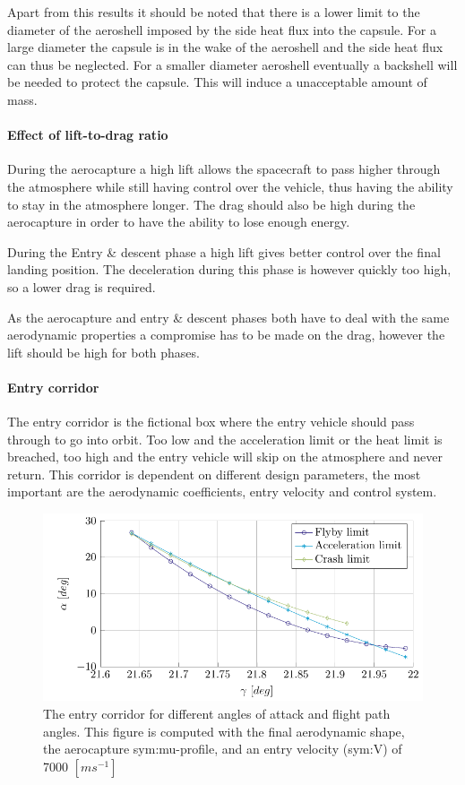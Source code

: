 Apart from this results it should be noted that there is a lower limit to the diameter of the aeroshell imposed by the side heat flux into the capsule. For a large diameter the capsule is in the wake of the aeroshell and the side heat flux can thus be neglected. For a smaller diameter aeroshell eventually a backshell will be needed to protect the capsule. This will induce a unacceptable amount of mass.

\paragraph{Effect of lift-to-drag ratio}
During the aerocapture a high lift allows the spacecraft to pass higher through the atmosphere while still having control over the vehicle, thus having the ability to stay in the atmosphere longer. The drag should also be high during the aerocapture in order to have the ability to lose enough energy.

During the Entry \& descent phase a high lift gives better control over the final landing position. The deceleration during this phase is however quickly too high, so a lower drag is required.

As the aerocapture and entry \& descent phases both have to deal with the same aerodynamic properties a compromise has to be made on the drag, however the lift should be high for both phases.

\paragraph{Entry corridor}
The entry corridor is the fictional box where the entry vehicle should pass through to go into orbit. Too low and the acceleration limit or the heat limit is breached, too high and the entry vehicle will skip on the atmosphere and never return. This corridor is dependent on different design parameters, the most important are the aerodynamic coefficients, entry velocity and control system.

\begin{figure}[h]
	\centering
	\includegraphics[width=\textwidth]{./Figure/orbit/alpha_gamma.pdf}
	\caption[The entry corridor for different angles of attack and flight path angles]{The entry corridor for different angles of attack and flight path angles. This figure is computed with the final aerodynamic shape, the aerocapture \gls{sym:mu}-profile, and an entry velocity (\gls{sym:V}) of 7000 $\left[m s^{-1}\right]$}
	\label{fig:alpha_gamma}
\end{figure}


